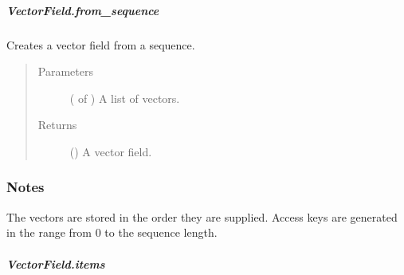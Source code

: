 \documentclass[letterpaper,10pt,english]{sphinxmanual}
\begin{document}
\begin{fulllineitems}
\subparagraph{VectorField.from\_sequence}
\label{\detokenize{api/generated/directional_clustering.fields.VectorField.from_sequence:vectorfield-from-sequence}}\label{\detokenize{api/generated/directional_clustering.fields.VectorField.from_sequence::doc}}

\begin{fulllineitems}
\label{\detokenize{api/generated/directional_clustering.fields.VectorField.from_sequence:directional_clustering.fields.VectorField.from_sequence}}
Creates a vector field from a sequence.
\begin{quote}\begin{description}
\item[{Parameters}] \leavevmode
{} ( of ) \textendash{} A list of vectors.

\item[{Returns}] \leavevmode
{} () \textendash{} A vector field.

\end{description}\end{quote}
\subsubsection*{Notes}

The vectors are stored in the order they are supplied.
Access keys are generated in the range from 0 to the sequence length.

\end{fulllineitems}



\subparagraph{VectorField.items}
\label{\detokenize{api/generated/directional_clustering.fields.VectorField.items:vectorfield-items}}\label{\detokenize{api/generated/directional_clustering.fields.VectorField.items::doc}}


\end{fulllineitems}
\end{document}
